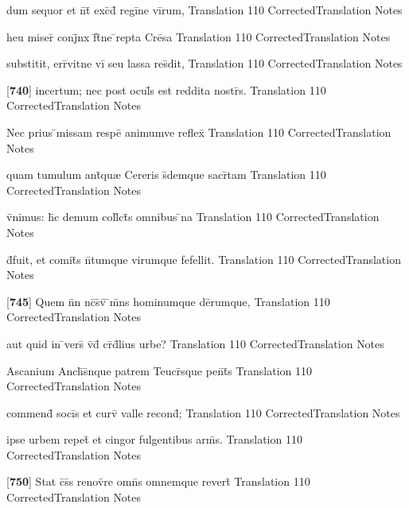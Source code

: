 \latline
  {dum sequor et n\={}t\={} exc\={}d\={} regi\={}ne vi\={}rum,}
  { Translation }
  {110}
  { CorrectedTranslation }
  { Notes }


\latline
  {heu miser\={} conj\={}nx f\={}t\={}ne \={}repta Cre\={}sa}
  { Translation }
  {110}
  { CorrectedTranslation }
  { Notes }


\latline
  {substitit, err\={}vitne vi\={} seu lassa res\={}dit,}
  { Translation }
  {110}
  { CorrectedTranslation }
  { Notes }


\latline
  {[\textbf{740}] incertum; nec post ocul\={\macron {\i}}s est reddita nostr\={\macron {\i}}s.}
  { Translation }
  {110}
  { CorrectedTranslation }
  { Notes }


\latline
  {Nec prius \={}missam respe\={\macron {\i}} animumve reflex\={\macron {\i}}}
  { Translation }
  {110}
  { CorrectedTranslation }
  { Notes }


\latline
  {quam tumulum ant\={\macron {\i}}qu{\ae} Cereris s\={}demque sacr\={}tam}
  { Translation }
  {110}
  { CorrectedTranslation }
  { Notes }


\latline
  {v\={}nimus: h\={\macron {\i}}c demum coll\={}ct\={\macron {\i}}s omnibus \={}na}
  { Translation }
  {110}
  { CorrectedTranslation }
  { Notes }


\latline
  {d\={}fuit, et comit\={}s n\={}tumque virumque fefellit.}
  { Translation }
  {110}
  { CorrectedTranslation }
  { Notes }


\latline
  {[\textbf{745}] Quem n\={}n nc\={}s\={}v\={\macron {\i}} \={}m\={}ns hominumque de\={}rumque,}
  { Translation }
  {110}
  { CorrectedTranslation }
  { Notes }


\latline
  {aut quid in \={}vers\={} v\={\macron {\i}}d\={\macron {\i}} cr\={}d\={}lius urbe?}
  { Translation }
  {110}
  { CorrectedTranslation }
  { Notes }


\latline
  {Ascanium Anch\={\macron {\i}}s\={}nque patrem Teucr\={}sque pen\={}t\={\macron {\i}}s}
  { Translation }
  {110}
  { CorrectedTranslation }
  { Notes }


\latline
  {commend\={} soci\={\macron {\i}}s et curv\={} valle recond\={};}
  { Translation }
  {110}
  { CorrectedTranslation }
  { Notes }


\latline
  {ipse urbem repet\={} et cingor fulgentibus arm\={\macron {\i}}s.}
  { Translation }
  {110}
  { CorrectedTranslation }
  { Notes }


\latline
  {[\textbf{750}] Stat c\={}s\={}s renov\={}re omn\={\macron {\i}}s omnemque revert\={\macron {\i}}}
  { Translation }
  {110}
  { CorrectedTranslation }
  { Notes }


